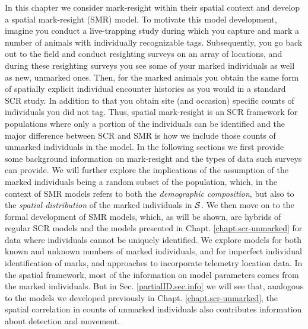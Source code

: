 In this chapter we consider mark-resight within
their %
spatial context and
develop a spatial mark-resight (SMR) model. To motivate this model
development, imagine you conduct a live-trapping study during which
you capture and mark a number of animals with individually
recognizable tags. Subsequently, you go back out to the field and
conduct resighting surveys on an array of locations, and during these
resighting surveys you see some of your marked individuals as well as
new, unmarked ones. Then, for the marked animals you obtain the same
form of spatially explicit individual encounter histories as you would
in a standard SCR study. In addition to that you obtain site (and occasion)
specific counts of individuals you did not tag. Thus, spatial
mark-resight is an SCR framework for populations where only a portion of
the individuals can be identified and the major difference between SCR
and SMR is how we include those counts of unmarked individuals in the
model. In the following sections we first provide some background
information on mark-resight and the types of data such surveys can
provide. We will further explore the implications of the assumption of
the marked individuals being a random subset of the population, which,
in the context of SMR models refers to both the \emph{demographic
  composition}, but also to the \emph{spatial distribution} of the
marked individuals in ${\cal S}$.
We then move on to the formal
development of SMR models,
which, as will be shown, are hybrids of regular SCR models and the
models presented in Chapt. \ref{chapt.scr-unmarked}
for data where individuals cannot be uniquely identified. We explore models for
both known and unknown numbers of marked individuals, and for
imperfect individual identification of marks, and approaches to incorporate
telemetry location data. In the spatial
framework, most of the information on model parameters comes from the
marked individuals. But in Sec. \ref{partialID.sec.info} we will see
that, analogous to the models we developed previously in
Chapt. \ref{chapt.scr-unmarked}, the spatial correlation in counts of
unmarked individuals also contributes information about detection and
movement.

